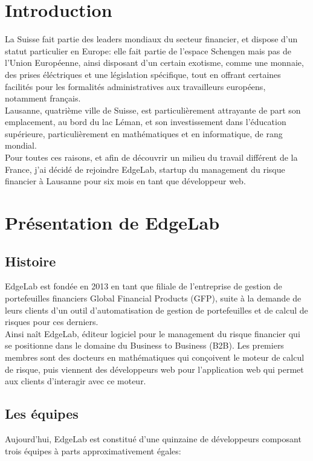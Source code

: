 \documentclass[a4paper,french,12pt]{article}
\begin{document}
\newpage

\section{Introduction}

	La Suisse fait partie des leaders mondiaux du secteur financier, et dispose d'un statut particulier en Europe: elle fait partie de l'espace Schengen mais pas de l'Union Européenne, ainsi disposant d'un certain exotisme, comme une monnaie, des prises éléctriques et une législation spécifique, tout en offrant certaines facilités pour les formalités administratives aux travailleurs européens, notamment français.~\\	
	
	
	Lausanne, quatrième ville de Suisse, est particulièrement attrayante de part son emplacement, au bord du lac Léman, et son investissement dans l'éducation supérieure, particulièrement en mathématiques et en informatique, de rang mondial.~\\	

	Pour toutes ces raisons, et afin de découvrir un milieu du travail différent de la France, j'ai décidé de rejoindre EdgeLab, startup du management du risque financier à Lausanne pour six mois en tant que développeur web.

\section{Présentation de EdgeLab}

	\subsection{Histoire}
		EdgeLab est fondée en 2013 en tant que filiale de l'entreprise de gestion de portefeuilles financiers Global Financial Products (GFP), suite à la demande de leurs clients d'un outil d'automatisation de gestion de portefeuilles et de calcul de risques pour ces derniers.~\\	

	Ainsi naît EdgeLab, éditeur logiciel pour le management du risque financier qui se positionne dans le domaine du Business to Business (B2B). Les premiers membres sont des docteurs en mathématiques qui conçoivent le moteur de calcul de risque, puis viennent des développeurs web pour l'application web qui permet aux clients d’interagir avec ce moteur.	
	
	\subsection{Les équipes}
			Aujourd'hui, EdgeLab est constitué d'une quinzaine de développeurs composant trois équipes à parts approximativement égales:~\\	
\end{document}
